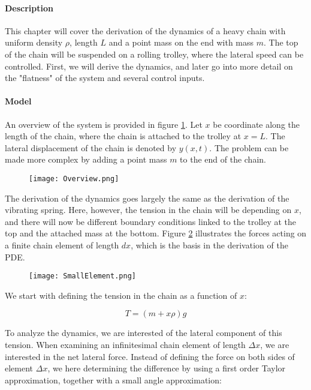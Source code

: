 

\paragraph{Description}
This chapter will cover the derivation of the dynamics of a heavy chain with uniform density $\rho$, length $L$ and a point mass on the end with mass $m$. The top of the chain will be suspended on a rolling trolley, where the lateral speed can be controlled. First, we will derive the dynamics, and later go into more detail on the "flatness" of the system and several control inputs.

\paragraph{Model}

An overview of the system is provided in figure \ref{fig:heavychainoverview}. Let $x$ be coordinate along the length of the chain, where the chain is attached to the trolley at $x=L$. The lateral displacement of the chain is denoted by $y(x,t)$. The problem can be made more complex by adding a point mass $m$ to the end of the chain.

\begin{figure}[h]
\label{fig:heavychainoverview}
\centering
\texttt{[image: Overview.png]}
\end{figure}

The derivation of the dynamics goes largely the same as the derivation of the vibrating spring. Here, however, the tension in the chain will be depending on $x$, and there will now be different boundary conditions linked to the trolley at the top and the attached mass at the bottom. Figure \ref{fig:heavychaindx} illustrates the forces acting on a finite chain element of length $dx$, which is the basis in the derivation of the PDE.\newline

\begin{figure}[h]
\label{fig:heavychaindx}
\centering
\texttt{[image: SmallElement.png]}
\end{figure}

We start with defining the tension in the chain as a function of $x$:

\begin{equation}
\label{eq:chaintension}
T = (m + x\rho)g
\end{equation}

To analyze the dynamics, we are interested of the lateral component of this tension. When examining an infinitesimal chain element of length $\Delta x$, we are interested in the net lateral force. Instead of defining the force on both sides of element $\Delta x$, we here determining the difference by using a first order Taylor approximation, together with a small angle approximation:

